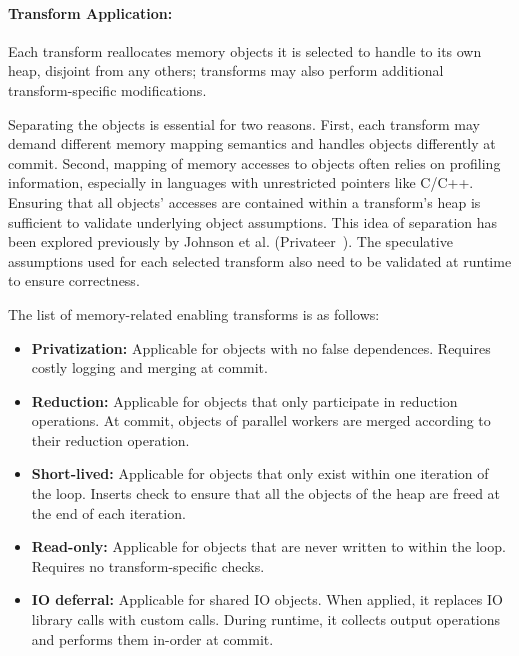 \paragraph{Transform Application:}
Each transform reallocates
memory objects it is selected to handle
to its own heap, disjoint from any others; transforms may also
perform additional transform-specific modifications.

Separating the objects is essential
for two reasons. First, each transform may demand different
memory mapping semantics and handles objects differently at commit.
Second, mapping of memory accesses to
objects often relies on profiling information, especially in languages with
unrestricted pointers like C/C++. Ensuring that all objects' accesses
are contained within a transform's heap is sufficient to
validate underlying object assumptions. This idea of separation has
been explored previously by Johnson et al. (Privateer~\cite{johnson:12:pldi}).
The speculative assumptions used for each selected transform also need
to be validated at runtime to ensure correctness.

The list of memory-related enabling transforms is as follows:

\begin{itemize}
%
  \item \textbf{Privatization:} Applicable for objects with no false dependences.
  Requires costly logging and merging at commit.

\item \textbf{Reduction:} Applicable for objects that only participate in
reduction operations. At commit, objects of parallel
workers are merged according to their reduction operation.




\item \textbf{Short-lived:} Applicable for objects that only exist within one
iteration of the loop. Inserts check to ensure that all
the objects of the heap are freed at the end of each iteration.

\item \textbf{Read-only:} Applicable for objects that are never written to within
the loop. Requires no transform-specific checks.

\item \textbf{IO deferral:} Applicable for shared IO objects. When applied, it
replaces IO library calls with custom calls. During runtime, it
collects output operations and performs them in-order at commit.

\end{itemize}

